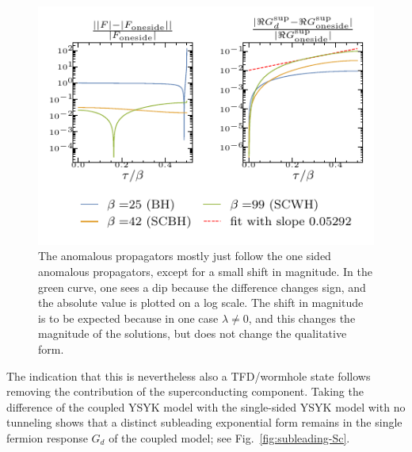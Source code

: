 \begin{figure}
    \centering
    \includegraphics[width=0.75\linewidth]{figures/chapter3/ratioFsv2.pdf} %
    \caption{The anomalous propagators mostly just follow the one sided anomalous propagators, except for a small shift in magnitude. In the green curve, one sees a dip because the difference changes sign, and the absolute value is plotted on a log scale. The shift in magnitude is to be expected because in one case $\lambda \neq 0$, and this changes the magnitude of the solutions, but does not change the qualitative form.}
    \label{fig:Fratio}
\end{figure}
The indication that this is nevertheless also a TFD/wormhole state follows removing the contribution of the superconducting component. Taking the difference of the coupled YSYK model with the single-sided YSYK model with no tunneling shows that a distinct subleading exponential form remains in the single fermion response $G_d$ of the coupled model; see Fig.~\ref{fig:subleading-Sc}.
